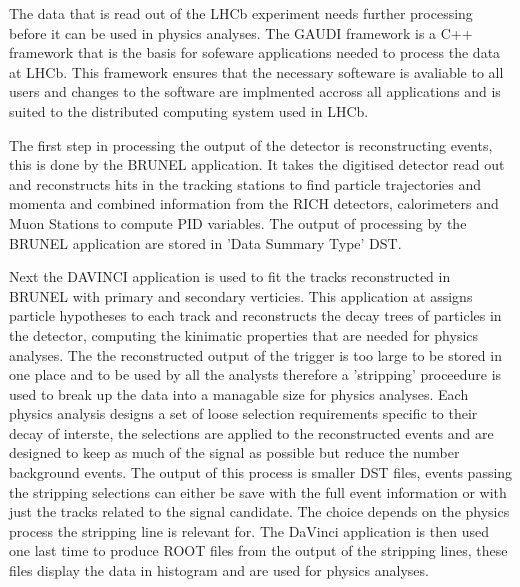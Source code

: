 The data that is read out of the LHCb experiment needs further processing before it can be used in physics analyses. The \textsc{GAUDI} framework \cite{Mato:1998gfa} is a C++ framework that is the basis for sofeware applications needed to process the data at LHCb\cite{Antunes-Nobrega:835156}. This framework ensures that the necessary softeware is avaliable to all users and changes to the software are implmented accross all applications and is suited to the distributed computing system used in LHCb\cite{Stagni:2012rs}. 


The first step in processing the output of the detector is reconstructing events, this is done by the \textsc{BRUNEL} application. It takes the digitised detector read out and reconstructs hits in the tracking stations to find particle trajectories and momenta and combined information from the RICH detectors, calorimeters and Muon Stations to compute PID variables. The output of processing by the \textsc{BRUNEL} application are stored in 'Data Summary Type' DST. 

Next the \textsc{DA}\textsc{VINCI} application is used to fit the tracks reconstructed in \textsc{BRUNEL} with primary and secondary verticies. This application at assigns particle hypotheses to each track and reconstructs the decay trees of particles in the detector, computing the kinimatic properties that are needed for physics analyses. The the reconstructed output of the trigger is too large to be stored in one place and to be used by all the analysts therefore a 'stripping' proceedure is used to break up the data into a managable size for physics analyses. Each physics analysis designs a set of loose selection requirements specific to their decay of interste, the selections are applied to the reconstructed events and are designed to keep as much of the signal as possible but reduce the number background events. The output of this process is smaller DST files, events passing the stripping selections can either be save with the full event information or with just the tracks related to the signal candidate. The choice depends on the physics process the stripping line is relevant for. The DaVinci application is then used one last time to produce \textsc{ROOT}\cite{Brun:1997pa} files from the output of the stripping lines, these files display the data in histogram and are used for physics analyses. %


